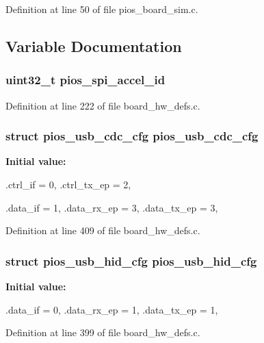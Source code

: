 \-Definition at line 50 of file pios\-\_\-board\-\_\-sim.\-c.



\subsection{\-Variable \-Documentation}
\hypertarget{group___discovery_f4_ga30b6021756ffd1dec65a7edc27179895}{
\subsubsection[{pios\-\_\-spi\-\_\-accel\-\_\-id}]{\setlength{\rightskip}{0pt plus 5cm}uint32\-\_\-t {\bf pios\-\_\-spi\-\_\-accel\-\_\-id}}}\label{group___discovery_f4_ga30b6021756ffd1dec65a7edc27179895}


\-Definition at line 222 of file board\-\_\-hw\-\_\-defs.\-c.

\hypertarget{group___discovery_f4_ga05cc3e449d417c7f9097d2659e6f5ca3}{
\subsubsection[{pios\-\_\-usb\-\_\-cdc\-\_\-cfg}]{\setlength{\rightskip}{0pt plus 5cm}struct {\bf pios\-\_\-usb\-\_\-cdc\-\_\-cfg} {\bf pios\-\_\-usb\-\_\-cdc\-\_\-cfg}}}\label{group___discovery_f4_ga05cc3e449d417c7f9097d2659e6f5ca3}
{\bfseries \-Initial value\-:}
\begin{DoxyCode}
 {
        .ctrl_if = 0,
        .ctrl_tx_ep = 2,

        .data_if = 1,
        .data_rx_ep = 3,
        .data_tx_ep = 3,
}
\end{DoxyCode}


\-Definition at line 409 of file board\-\_\-hw\-\_\-defs.\-c.

\hypertarget{group___discovery_f4_ga3665f6d3a2cccc431b55b9432291e94c}{
\subsubsection[{pios\-\_\-usb\-\_\-hid\-\_\-cfg}]{\setlength{\rightskip}{0pt plus 5cm}struct {\bf pios\-\_\-usb\-\_\-hid\-\_\-cfg} {\bf pios\-\_\-usb\-\_\-hid\-\_\-cfg}}}\label{group___discovery_f4_ga3665f6d3a2cccc431b55b9432291e94c}
{\bfseries \-Initial value\-:}
\begin{DoxyCode}
 {
        .data_if = 0,
        .data_rx_ep = 1,
        .data_tx_ep = 1,
}
\end{DoxyCode}


\-Definition at line 399 of file board\-\_\-hw\-\_\-defs.\-c.

